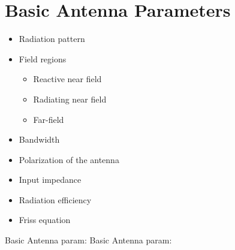 \section{Basic Antenna Parameters}


\begin{itemize}
\item Radiation pattern
\item Field regions
  \begin{itemize}
  \item Reactive near field
  \item Radiating near field
  \item Far-field
  \end{itemize}
\item Bandwidth
\item Polarization of the antenna
\item Input impedance
\item Radiation efficiency
\item Friss equation
\end{itemize}
Basic Antenna param:
\cite{balanis2012antenna}
Basic Antenna param:
\cite{lamont2009fundamentalsAnt}
